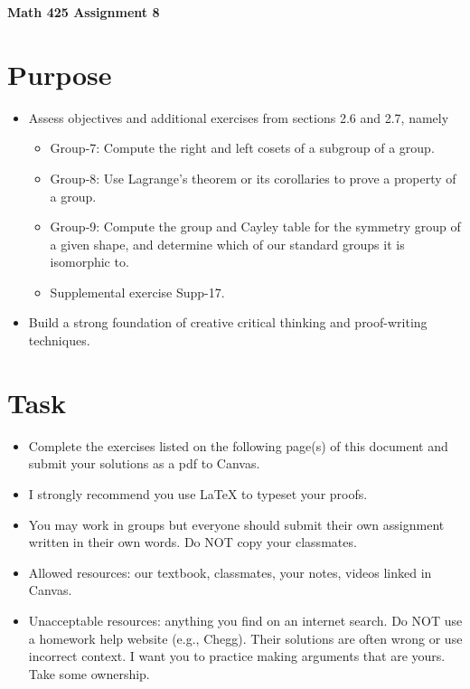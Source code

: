 \documentclass[12pt]{article}
\begin{document}
	\begin{center}
		{\Large \bf Math 425 Assignment 8}
	\end{center}
	\section*{Purpose}
	\begin{itemize}
		\item Assess objectives and additional exercises from sections 2.6 and 2.7, namely
		\begin{itemize}
			\item Group-7:	Compute the right and left cosets of a subgroup of a group.
			\item Group-8:	Use Lagrange’s theorem or its corollaries to prove a property of a group.
			\item Group-9:	Compute the group and Cayley table for the symmetry group of a given shape, and determine which of our standard groups it is isomorphic to.
			\item Supplemental exercise Supp-17.
		\end{itemize}
		\item Build a strong foundation of creative critical thinking and proof-writing techniques.
	\end{itemize}
	\section*{Task}
	\begin{itemize}
		\item Complete the exercises listed on the following page(s) of this document and submit your solutions as a pdf to Canvas.
		\item I strongly recommend you use LaTeX to typeset your proofs.
		\item You may work in groups but everyone should submit their own assignment written in their own words.  Do NOT copy your classmates.
		\item Allowed resources: our textbook, classmates, your notes, videos linked in Canvas.
		\item Unacceptable resources: anything you find on an internet search. Do NOT use a homework help website (e.g., Chegg). Their solutions are often wrong or use incorrect context.  I want you to practice making arguments that are yours. Take some ownership.
	\end{itemize}
\end{document}
